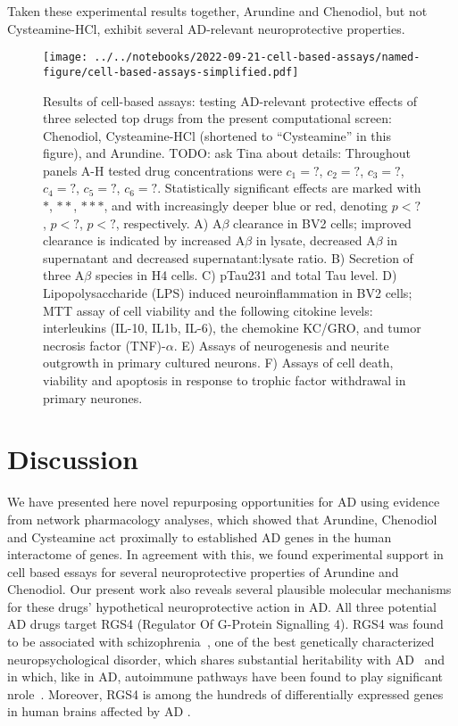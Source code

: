 \documentclass[letterpaper]{article}
\begin{document}
Taken these experimental results together, Arundine and Chenodiol, but not
Cysteamine-HCl, exhibit several AD-relevant neuroprotective properties.

\begin{figure}
\texttt{[image: ../../notebooks/2022-09-21-cell-based-assays/named-figure/cell-based-assays-simplified.pdf]}
\caption{Results of cell-based assays: testing AD-relevant protective effects of three
  selected top drugs from the present computational screen: Chenodiol,
  Cysteamine-HCl (shortened to ``Cysteamine'' in this figure), and Arundine.
  TODO: ask Tina about details: Throughout panels A-H tested drug
  concentrations were $c_1 = ?$, $c_2 = ?$, $c_3 = ?$, $c_4 = ?$, $c_5 = ?$,
  $c_6 = ?$.  Statistically significant effects are marked with $\ast$,
  $\ast\ast$, $\ast\ast\ast$, and with increasingly deeper blue or red,
  denoting $p < ?$, $p < ?$,  $p < ?$, respectively.
  A) A$\beta$ clearance in BV2 cells; improved clearance is indicated by
  increased A$\beta$ in lysate, decreased A$\beta$ in supernatant and
  decreased supernatant:lysate ratio.
  B) Secretion of three A$\beta$ species in H4 cells.
  C) pTau231 and total Tau level.
  D) Lipopolysaccharide (LPS) induced neuroinflammation in BV2 cells; MTT
  assay of cell viability and the following citokine levels: interleukins
  (IL-10, IL1b, IL-6), the chemokine KC/GRO, and tumor necrosis factor
  (TNF)-$\alpha$.
  E) Assays of neurogenesis and neurite outgrowth in primary cultured neurons.
  F) Assays of cell death, viability and apoptosis in response to trophic
  factor withdrawal in primary neurones.
}
\label{fig:cell-based-assays}
\end{figure}


\section{Discussion}

We have presented here novel repurposing opportunities for AD using evidence
from network pharmacology analyses, which showed that Arundine, Chenodiol and
Cysteamine act proximally to established AD genes in the human interactome of
genes.  In agreement with this, we found experimental support in cell based
essays for several neuroprotective properties of Arundine and Chenodiol.  Our
present work also reveals several plausible molecular mechanisms for these
drugs' hypothetical neuroprotective action in AD.  All three potential AD drugs
target RGS4 (Regulator Of G-Protein Signalling 4).  RGS4 was found to be
associated with schizophrenia~\citep{Chowdari2002}, one of the best
genetically characterized neuropsychological disorder, which shares
substantial heritability with AD~\citep{Consortium2018} and in which, like in
AD, autoimmune pathways have been found to play significant
nrole~\citep{Sekar2016a}.  Moreover, RGS4 is among the hundreds of
differentially expressed genes in human brains affected by AD
\cite{Taubes2021}.
\end{document}
